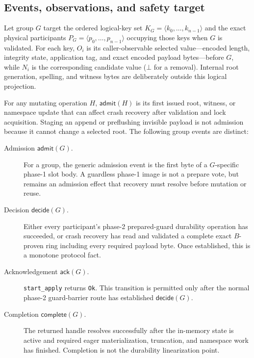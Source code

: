 \documentclass[10pt,twocolumn]{article}
\theoremstyle{remark}
\newcommand{\code}[1]{\texttt{#1}}
\newcommand{\absent}{\bot}
\begin{document}
\subsection{Events, observations, and safety target}

Let group $G$ target the ordered logical-key set
$K_G=\langle k_0,\ldots,k_{n-1}\rangle$ and the exact physical participants
$P_G=\langle p_0,\ldots,p_{n-1}\rangle$ occupying those keys when $G$ is validated. For each key,
$O_i$ is its caller-observable selected value---encoded length, integrity state, application tag,
and exact encoded payload bytes---before $G$, while $N_i$ is the corresponding candidate value
($\absent$ for a removal). Internal root generation, spelling, and witness bytes are deliberately
outside this logical projection.

For any mutating operation $H$, $\mathsf{admit}(H)$ is its first issued root, witness, or namespace
update that can affect crash recovery after validation and lock acquisition. Staging an append or
preflushing invisible payload is not admission because it cannot change a selected root. The
following group events are distinct:
\begin{description}
  \item[Admission $\mathsf{admit}(G)$.] For a group, the generic admission event is the first byte
  of a $G$-specific phase-1 slot body. A guardless phase-1 image is not a prepare vote, but remains
  an admission effect that recovery must resolve before mutation or reuse.
  \item[Decision $\mathsf{decide}(G)$.] Either every participant's phase-2 prepared-guard
  durability operation has succeeded, or crash recovery has read and validated a complete exact
  $B$-proven ring including every required payload byte. Once established, this is a monotone
  protocol fact.
  \item[Acknowledgement $\mathsf{ack}(G)$.] \code{start\_apply} returns \code{Ok}. This transition is
  permitted only after the normal phase-2 guard-barrier route has established
  $\mathsf{decide}(G)$.
  \item[Completion $\mathsf{complete}(G)$.] The returned handle resolves successfully after the
  in-memory state is active and required eager materialization, truncation, and namespace work has
  finished. Completion is not the durability linearization point.
\end{description}
\end{document}
